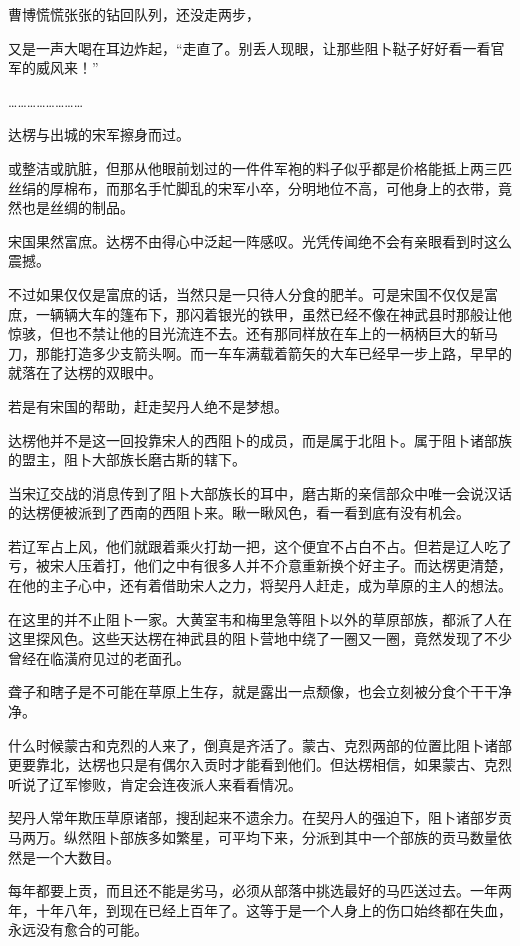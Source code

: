 曹博慌慌张张的钻回队列，还没走两步，

又是一声大喝在耳边炸起，“走直了。别丢人现眼，让那些阻卜鞑子好好看一看官军的威风来！”

……………………

达楞与出城的宋军擦身而过。

或整洁或肮脏，但那从他眼前划过的一件件军袍的料子似乎都是价格能抵上两三匹丝绢的厚棉布，而那名手忙脚乱的宋军小卒，分明地位不高，可他身上的衣带，竟然也是丝绸的制品。

宋国果然富庶。达楞不由得心中泛起一阵感叹。光凭传闻绝不会有亲眼看到时这么震撼。

不过如果仅仅是富庶的话，当然只是一只待人分食的肥羊。可是宋国不仅仅是富庶，一辆辆大车的篷布下，那闪着银光的铁甲，虽然已经不像在神武县时那般让他惊骇，但也不禁让他的目光流连不去。还有那同样放在车上的一柄柄巨大的斩马刀，那能打造多少支箭头啊。而一车车满载着箭矢的大车已经早一步上路，早早的就落在了达楞的双眼中。

若是有宋国的帮助，赶走契丹人绝不是梦想。

达楞他并不是这一回投靠宋人的西阻卜的成员，而是属于北阻卜。属于阻卜诸部族的盟主，阻卜大部族长磨古斯的辖下。

当宋辽交战的消息传到了阻卜大部族长的耳中，磨古斯的亲信部众中唯一会说汉话的达楞便被派到了西南的西阻卜来。瞅一瞅风色，看一看到底有没有机会。

若辽军占上风，他们就跟着乘火打劫一把，这个便宜不占白不占。但若是辽人吃了亏，被宋人压着打，他们之中有很多人并不介意重新换个好主子。而达楞更清楚，在他的主子心中，还有着借助宋人之力，将契丹人赶走，成为草原的主人的想法。

在这里的并不止阻卜一家。大黄室韦和梅里急等阻卜以外的草原部族，都派了人在这里探风色。这些天达楞在神武县的阻卜营地中绕了一圈又一圈，竟然发现了不少曾经在临潢府见过的老面孔。

聋子和瞎子是不可能在草原上生存，就是露出一点颓像，也会立刻被分食个干干净净。

什么时候蒙古和克烈的人来了，倒真是齐活了。蒙古、克烈两部的位置比阻卜诸部更要靠北，达楞也只是有偶尔入贡时才能看到他们。但达楞相信，如果蒙古、克烈听说了辽军惨败，肯定会连夜派人来看看情况。

契丹人常年欺压草原诸部，搜刮起来不遗余力。在契丹人的强迫下，阻卜诸部岁贡马两万。纵然阻卜部族多如繁星，可平均下来，分派到其中一个部族的贡马数量依然是一个大数目。

每年都要上贡，而且还不能是劣马，必须从部落中挑选最好的马匹送过去。一年两年，十年八年，到现在已经上百年了。这等于是一个人身上的伤口始终都在失血，永远没有愈合的可能。

